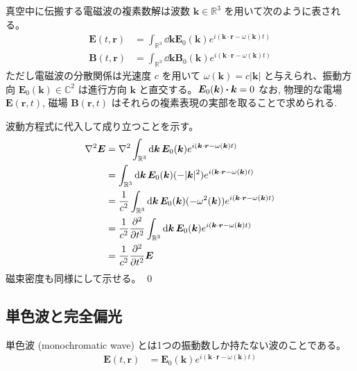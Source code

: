 \documentclass[uplatex,dvipdfmx,a4paper,11pt]{jlreq}
\makeatletter
\newcommand{\CC}{\mathbb{C}}
\newcommand{\RR}{\mathbb{R}}
\newcommand{\EE}{\bm{E}}
\newcommand{\BB}{\bm{B}}
\newcommand{\rr}{\bm{r}}
\newcommand{\kk}{\bm{k}}
\theoremstyle{definition}
\renewenvironment{proof}[1][\proofname]{\par
  \normalfont
  \topsep6\p@\@plus6\p@ \trivlist
  \item[\hskip\labelsep{\bfseries #1}\@addpunct{\bfseries}]\ignorespaces\quad\par
}{%
  \qed\endtrivlist\@endpefalse
}
\renewcommand\proofname{証明}
\makeatother
\begin{document}
\begin{theorem}[]
  真空中に伝搬する電磁波の複素数解は波数 $\kk\in\RR^3$ を用いて次のように表される。
  \begin{align}
    \EE(t, \rr) & = \int_{\RR^3}\dd{\kk}\EE_0(\kk)e^{i(\kk\cdot\rr - \omega(\kk)t)} \\
    \BB(t, \rr) & = \int_{\RR^3}\dd{\kk}\BB_0(\kk)e^{i(\kk\cdot\rr - \omega(\kk)t)}
  \end{align}
  ただし電磁波の分散関係は光速度 $c$ を用いて $\omega(\kk) = c|\kk|$ と与えられ、振動方向 $\EE_0(\kk)\in\CC^2$ は進行方向 $\kk$ と直交する。$\EE_0(\kk)\vdot\kk = 0$
  なお, 物理的な電場 $\EE(\rr, t)$, 磁場 $\BB(\rr, t)$ はそれらの複素表現の実部を取ることで求められる.
\end{theorem}
\begin{proof}
  波動方程式に代入して成り立つことを示す。
  \begin{align}
    \nabla^2\EE & = \nabla^2\int_{\RR^3}\dd{\kk}\EE_0(\kk)e^{i(\kk\cdot\rr - \omega(\kk)t)}                      \\
                & = \int_{\RR^3}\dd{\kk}\EE_0(\kk)(-|\kk|^2)e^{i(\kk\cdot\rr - \omega(\kk)t)}                    \\
                & = \frac{1}{c^2}\int_{\RR^3}\dd{\kk}\EE_0(\kk)(-\omega^2(\kk))e^{i(\kk\cdot\rr - \omega(\kk)t)} \\
                & = \frac{1}{c^2}\pdv[2]{t}\int_{\RR^3}\dd{\kk}\EE_0(\kk)e^{i(\kk\cdot\rr - \omega(\kk)t)}       \\
                & = \frac{1}{c^2}\pdv[2]{t}\EE
  \end{align}
  磁束密度も同様にして示せる。
\end{proof}

\subsection{単色波と完全偏光}
\begin{definition}[単色波]
  単色波 (monochromatic wave) とは1つの振動数しか持たない波のことである。
  \begin{align}
    \EE(t, \rr) & = \EE_0(\kk)e^{i(\kk\cdot\rr - \omega(\kk)t)}
  \end{align}
\end{definition}
\end{document}
